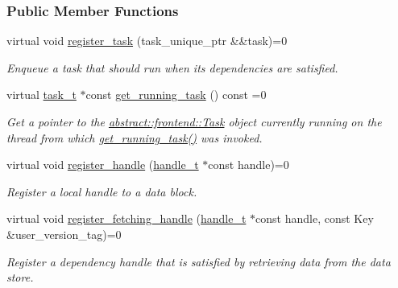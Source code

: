 \subsubsection*{Public Member Functions}
\begin{DoxyCompactItemize}
\item 
virtual void \hyperlink{classdarma__runtime_1_1abstract_1_1backend_1_1_runtime_aec2382c6822c63ed76f69af1e1f8470b}{register\+\_\+task} (task\+\_\+unique\+\_\+ptr \&\&task)=0
\begin{DoxyCompactList}\small\item\em Enqueue a task that should run when its dependencies are satisfied. \end{DoxyCompactList}\item 
virtual \hyperlink{classdarma__runtime_1_1abstract_1_1frontend_1_1_task}{task\+\_\+t} $\ast$const \hyperlink{classdarma__runtime_1_1abstract_1_1backend_1_1_runtime_a7081e6e5cd86df28496d5f06f55b2001}{get\+\_\+running\+\_\+task} () const  =0
\begin{DoxyCompactList}\small\item\em Get a pointer to the \hyperlink{classdarma__runtime_1_1abstract_1_1frontend_1_1_task}{abstract\+::frontend\+::\+Task} object currently running on the thread from which \hyperlink{classdarma__runtime_1_1abstract_1_1backend_1_1_runtime_a7081e6e5cd86df28496d5f06f55b2001}{get\+\_\+running\+\_\+task()} was invoked. \end{DoxyCompactList}\item 
virtual void \hyperlink{classdarma__runtime_1_1abstract_1_1backend_1_1_runtime_a8c70dc2b90fedd7ae6f090a19b3f694f}{register\+\_\+handle} (\hyperlink{classdarma__runtime_1_1abstract_1_1frontend_1_1_dependency_handle}{handle\+\_\+t} $\ast$const handle)=0
\begin{DoxyCompactList}\small\item\em Register a local handle to a data block. \end{DoxyCompactList}\item 
virtual void \hyperlink{classdarma__runtime_1_1abstract_1_1backend_1_1_runtime_acdb81206fe8a663754cf68f44731b35e}{register\+\_\+fetching\+\_\+handle} (\hyperlink{classdarma__runtime_1_1abstract_1_1frontend_1_1_dependency_handle}{handle\+\_\+t} $\ast$const handle, const Key \&user\+\_\+version\+\_\+tag)=0
\begin{DoxyCompactList}\small\item\em Register a dependency handle that is satisfied by retrieving data from the data store. \end{DoxyCompactList}\item 

\end{DoxyCompactItemize}
